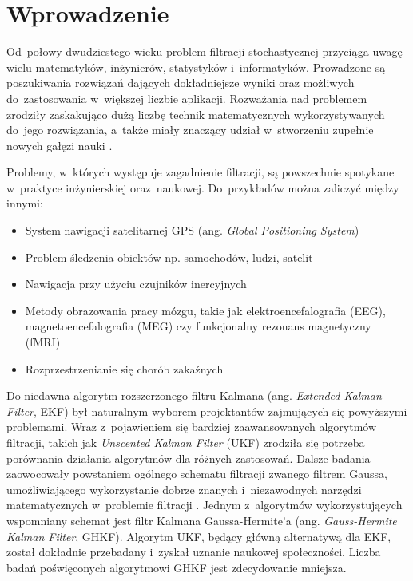 \chapter{Wprowadzenie}
\label{cha:introduction}
Od~połowy dwudziestego wieku problem filtracji stochastycznej przyciąga uwagę wielu matematyków, inżynierów, statystyków i~informatyków. Prowadzone są poszukiwania rozwiązań dających dokładniejsze wyniki oraz możliwych do~zastosowania w~większej liczbie aplikacji. Rozważania nad problemem zrodziły zaskakująco dużą liczbę technik matematycznych wykorzystywanych do~jego rozwiązania, a~także miały znaczący udział w~stworzeniu zupełnie nowych gałęzi nauki \cite{Crisan}. \par
Problemy, w~których występuje zagadnienie filtracji, są powszechnie spotykane w~praktyce inżynierskiej oraz~naukowej. Do~przykładów można zaliczyć między innymi: \cite[2]{Sarka}
\begin{itemize}
	\item System nawigacji satelitarnej GPS (ang. \textit{Global Positioning System})
	\item Problem śledzenia obiektów np. samochodów, ludzi, satelit
	\item Nawigacja przy użyciu czujników inercyjnych
	\item Metody obrazowania pracy mózgu, takie jak elektroencefalografia (EEG), magnetoencefalografia (MEG) czy funkcjonalny rezonans magnetyczny (fMRI)
	\item Rozprzestrzenianie się chorób zakaźnych
	
\end{itemize} \par
Do niedawna algorytm rozszerzonego filtru Kalmana (ang. \textit{Extended Kalman Filter}, EKF) był naturalnym wyborem projektantów zajmujących się powyższymi problemami. Wraz z~pojawieniem się bardziej zaawansowanych algorytmów filtracji, takich jak \textit{Unscented Kalman Filter} (UKF) zrodziła się potrzeba porównania działania algorytmów dla różnych zastosowań. Dalsze badania zaowocowały powstaniem ogólnego schematu filtracji zwanego filtrem Gaussa, umożliwiającego wykorzystanie dobrze znanych i~niezawodnych narzędzi matematycznych w~problemie filtracji \cite{Ito}. Jednym z~algorytmów wykorzystujących wspomniany schemat jest filtr Kalmana Gaussa-Hermite'a (ang. \textit{Gauss-Hermite Kalman Filter}, GHKF). Algorytm UKF, będący główną alternatywą dla EKF, został dokładnie przebadany i~zyskał uznanie naukowej społeczności. Liczba badań poświęconych algorytmowi GHKF jest zdecydowanie mniejsza.\\ \\

